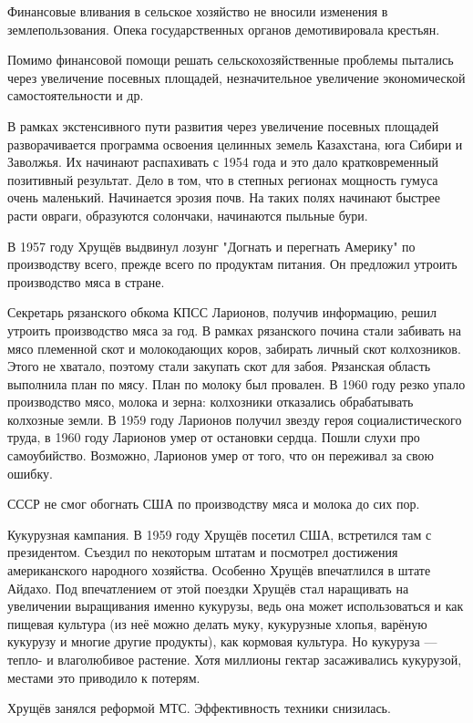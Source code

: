 \documentclass{article}
\begin{document}
Финансовые вливания в сельское хозяйство не вносили изменения в землепользования. Опека государственных органов демотивировала крестьян.

Помимо финансовой помощи решать сельскохозяйственные проблемы пытались через увеличение посевных площадей, незначительное увеличение экономической самостоятельности и др.

В рамках экстенсивного пути развития через увеличение посевных площадей разворачивается программа освоения целинных земель Казахстана, юга Сибири и Заволжья. Их начинают распахивать с 1954 года и это дало кратковременный позитивный результат. Дело в том, что в степных регионах мощность гумуса очень маленький. Начинается эрозия почв. На таких полях начинают быстрее расти овраги, образуются солончаки, начинаются пыльные бури.

В 1957 году Хрущёв выдвинул лозунг "Догнать и перегнать Америку" по производству всего, прежде всего по продуктам питания. Он предложил утроить производство мяса в стране.

Секретарь рязанского обкома КПСС Ларионов, получив информацию, решил утроить производство мяса за год. В рамках рязанского почина стали забивать на мясо племенной скот и молокодающих коров, забирать личный скот колхозников. Этого не хватало, поэтому стали закупать скот для забоя. Рязанская область выполнила план по мясу. План по молоку был провален. В 1960 году резко упало производство мясо, молока и зерна: колхозники отказались обрабатывать колхозные земли. В 1959 году Ларионов получил звезду героя социалистического труда, в 1960 году Ларионов умер от остановки сердца. Пошли слухи про самоубийство. Возможно, Ларионов умер от того, что он переживал за свою ошибку.

СССР не смог обогнать США по производству мяса и молока до сих пор.

Кукурузная кампания. В 1959 году Хрущёв посетил США, встретился там с президентом. Съездил по некоторым штатам и посмотрел достижения американского народного хозяйства. Особенно Хрущёв впечатлился в штате Айдахо. Под впечатлением от этой поездки Хрущёв стал наращивать на увеличении выращивания именно кукурузы, ведь она может использоваться и как пищевая культура (из неё можно делать муку, кукурузные хлопья, варёную кукурузу и многие другие продукты), как кормовая культура. Но кукуруза --- тепло- и влаголюбивое растение. Хотя миллионы гектар засаживались кукурузой, местами это приводило к потерям.

Хрущёв занялся реформой МТС. Эффективность техники снизилась.
\end{document}
